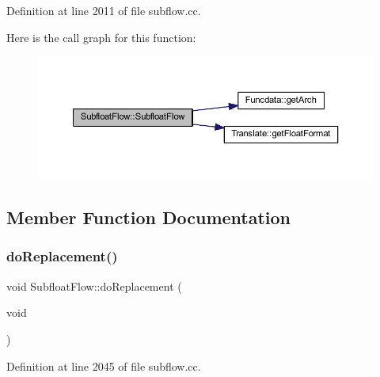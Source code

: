 Definition at line 2011 of file subflow.\+cc.

Here is the call graph for this function\+:
\nopagebreak
\begin{figure}[H]
\begin{center}
\leavevmode
\includegraphics[width=350pt]{class_subfloat_flow_a513a571ec4845bd6753dff960f6fafbf_cgraph}
\end{center}
\end{figure}


\subsection{Member Function Documentation}
\mbox{\label{class_subfloat_flow_ad9a5a1b26c82e8855d9eba6dcca0719c}} 
\subsubsection{\texorpdfstring{doReplacement()}{doReplacement()}}
{\footnotesize\ttfamily void Subfloat\+Flow\+::do\+Replacement (\begin{DoxyParamCaption}\item[{void}]{ }\end{DoxyParamCaption})}



Definition at line 2045 of file subflow.\+cc.

